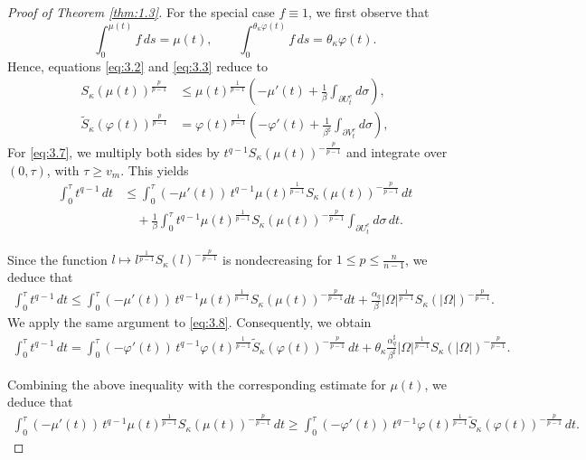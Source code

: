 \documentclass[10pt,a4paper]{amsart}
\begin{document}
\begin{proof}[Proof of Theorem \ref{thm:1.3}]
  For the special case $f\equiv 1$, we first observe that
\[
\int_0^{\mu(t)} f\, ds = \mu(t), 
\qquad 
\int_0^{\theta_\kappa \varphi(t)} f\, ds = \theta_\kappa \varphi(t).
\]
Hence, equations \eqref{eq:3.2} and \eqref{eq:3.3} reduce to
\begin{align}
S_\kappa(\mu(t))^{\frac{p}{p-1}}
&\le
\mu(t)^{\frac{1}{p-1}}
\left(-\mu'(t)+\frac{1}{\beta}\int_{\partial U_t^e} d\sigma\right),
\label{eq:3.7}
\\
\tilde S_\kappa(\varphi(t))^{\frac{p}{p-1}}
&=
\varphi(t)^{\frac{1}{p-1}}
\left(-\varphi'(t)+\frac{1}{\beta^\sharp}\int_{\partial V_t^e} d\sigma\right),
\label{eq:3.8}
\end{align}
For \eqref{eq:3.7}, we multiply both sides by
$t^{q-1} S_\kappa(\mu(t))^{-\frac{p}{p-1}}$
and integrate over $(0,\tau)$, with $\tau \ge v_m$. This yields
\begin{align*}
\int_0^\tau t^{q-1}\,dt
&\le
\int_0^\tau (-\mu'(t))\, t^{q-1}\mu(t)^{\frac{1}{p-1}}
S_\kappa(\mu(t))^{-\frac{p}{p-1}}\,dt
\nonumber\\
&\quad +
\frac{1}{\beta}
\int_0^\tau t^{q-1}\mu(t)^{\frac{1}{p-1}}
S_\kappa(\mu(t))^{-\frac{p}{p-1}}
\int_{\partial U_t^e} d\sigma\, dt.
\end{align*}

Since the function
$l \mapsto l^{\frac{1}{p-1}} S_\kappa(l)^{-\frac{p}{p-1}}$
is nondecreasing for $1 \le p \le \frac{n}{n-1}$, we deduce that
\begin{align*}
\int_0^\tau t^{q-1}\,dt
\le
\int_0^\tau (-\mu'(t))\, t^{q-1}\mu(t)^{\frac{1}{p-1}}
S_\kappa(\mu(t))^{-\frac{p}{p-1}}dt
+
\frac{\alpha_q}{\beta}
|\Omega|^{\frac{1}{p-1}}
S_\kappa(|\Omega|)^{-\frac{p}{p-1}}.
\end{align*}
We apply the same argument to \eqref{eq:3.8}. Consequently, we obtain
\begin{align*}
\int_0^\tau t^{q-1}\,dt
=
\int_0^\tau (-\varphi'(t))\, t^{q-1}\varphi(t)^{\frac{1}{p-1}}
\tilde{S}_\kappa(\varphi(t))^{-\frac{p}{p-1}}\,dt
+\theta_\kappa\frac{\alpha_q^\sharp}{\beta^\sharp}
|\Omega|^{\frac{1}{p-1}}
S_\kappa(|\Omega|)^{-\frac{p}{p-1}}.
\end{align*}

Combining the above inequality with the corresponding estimate for $\mu(t)$, we deduce that
\begin{align*}
\int_0^\tau (-\mu'(t))\,t^{q-1}\mu(t)^{\frac{1}{p-1}}
S_\kappa(\mu(t))^{-\frac{p}{p-1}}\,dt
\ge
\int_0^\tau (-\varphi'(t))\,t^{q-1}\varphi(t)^{\frac{1}{p-1}}
\tilde{S}_\kappa(\varphi(t))^{-\frac{p}{p-1}}\,dt.
\end{align*}


\end{proof}
\end{document}
